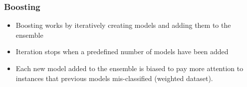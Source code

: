 \begin{frame}[fragile]\frametitle{Boosting}
\begin{itemize}
\item Boosting works by iteratively creating models and adding them to the ensemble
\item Iteration stops when a predefined number of models have been added
\item Each new model added to the ensemble is biased to pay more attention to instances that previous models mis-classified (weighted dataset). 
\end{itemize}
\end{frame}
%

%
%

